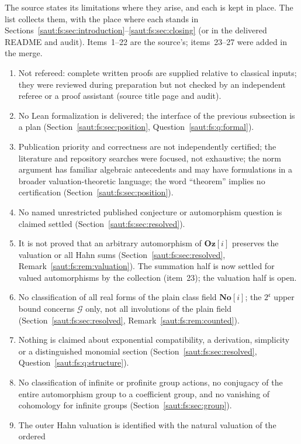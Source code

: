 \documentclass[11pt]{article}
\theoremstyle{definition}
\theoremstyle{remark}
\newcommand{\No}{\mathbf{No}}
\newcommand{\Oz}{\mathbf{Oz}}
\newcommand{\cc}{\mathfrak c}
\numberwithin{equation}{section}
\begin{document}
The source states its limitations where they arise, and each is kept in place. The
list collects them, with the place where each stands in
Sections~\ref{saut:fs:sec:introduction}--\ref{saut:fs:sec:closing} (or in the
delivered README and audit). Items~1--22 are the source's; items~23--27 were added in
the merge.
\begin{enumerate}[label=\arabic*.,leftmargin=2.2em]
\item Not refereed: complete written proofs are supplied relative to classical inputs;
they were reviewed during preparation but not checked by an independent referee or a
proof assistant (source title page and audit).
\item No Lean formalization is delivered; the interface of the previous subsection is
a plan (Section~\ref{saut:fs:sec:position}, Question~\ref{saut:fs:q:formal}).
\item Publication priority and correctness are not independently certified; the
literature and repository searches were focused, not exhaustive; the norm argument has
familiar algebraic antecedents and may have formulations in a broader
valuation-theoretic language; the word ``theorem'' implies no certification
(Section~\ref{saut:fs:sec:position}).
\item No named unrestricted published conjecture or automorphism question is claimed
settled (Section~\ref{saut:fs:sec:resolved}).
\item It is not proved that an arbitrary automorphism of $\Oz[i]$ preserves the
valuation or all Hahn sums (Section~\ref{saut:fs:sec:resolved},
Remark~\ref{saut:fs:rem:valuation}). The summation half is now settled for valued
automorphisms by the collection (item~23); the valuation half is open.
\item No classification of all real forms of the plain class field $\No[i]$; the
$2^{\cc}$ upper bound concerns $\mathcal G$ only, not all involutions of the plain field
(Section~\ref{saut:fs:sec:resolved}, Remark~\ref{saut:fs:rem:counted}).
\item Nothing is claimed about exponential compatibility, a derivation, simplicity or
a distinguished monomial section (Section~\ref{saut:fs:sec:resolved},
Question~\ref{saut:fs:q:structure}).
\item No classification of infinite or profinite group actions, no conjugacy of the
entire automorphism group to a coefficient group, and no vanishing of cohomology for
infinite groups (Section~\ref{saut:fs:sec:group}).
\item The outer Hahn valuation is identified with the natural valuation of the ordered

\end{enumerate}
\end{document}
